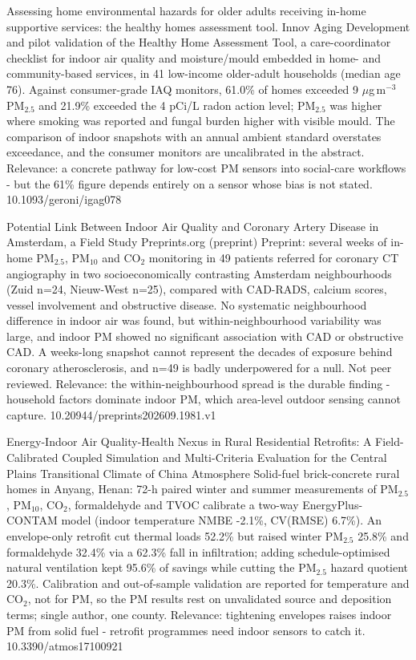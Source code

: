 \documentclass[10pt]{article}
\begin{document}
{Assessing home environmental hazards for older adults receiving in-home supportive services: the healthy homes assessment tool.}
{Innov Aging}
{Development and pilot validation of the Healthy Home Assessment Tool, a care-coordinator checklist for indoor air quality and moisture/mould embedded in home- and community-based services, in 41 low-income older-adult households (median age 76). Against consumer-grade IAQ monitors, 61.0\% of homes exceeded 9 $\mu$g\,m$^{-3}$ PM$_{2.5}$ and 21.9\% exceeded the 4 pCi/L radon action level; PM$_{2.5}$ was higher where smoking was reported and fungal burden higher with visible mould. The comparison of indoor snapshots with an annual ambient standard overstates exceedance, and the consumer monitors are uncalibrated in the abstract. Relevance: a concrete pathway for low-cost PM sensors into social-care workflows - but the 61\% figure depends entirely on a sensor whose bias is not stated.}
{10.1093/geroni/igag078}

{Potential Link Between Indoor Air Quality and Coronary Artery Disease in Amsterdam, a Field Study}
{Preprints.org (preprint)}
{Preprint: several weeks of in-home PM$_{2.5}$, PM$_{10}$ and CO$_2$ monitoring in 49 patients referred for coronary CT angiography in two socioeconomically contrasting Amsterdam neighbourhoods (Zuid n=24, Nieuw-West n=25), compared with CAD-RADS, calcium scores, vessel involvement and obstructive disease. No systematic neighbourhood difference in indoor air was found, but within-neighbourhood variability was large, and indoor PM showed no significant association with CAD or obstructive CAD. A weeks-long snapshot cannot represent the decades of exposure behind coronary atherosclerosis, and n=49 is badly underpowered for a null. Not peer reviewed. Relevance: the within-neighbourhood spread is the durable finding - household factors dominate indoor PM, which area-level outdoor sensing cannot capture.}
{10.20944/preprints202609.1981.v1}

{Energy-Indoor Air Quality-Health Nexus in Rural Residential Retrofits: A Field-Calibrated Coupled Simulation and Multi-Criteria Evaluation for the Central Plains Transitional Climate of China}
{Atmosphere}
{Solid-fuel brick-concrete rural homes in Anyang, Henan: 72-h paired winter and summer measurements of PM$_{2.5}$, PM$_{10}$, CO$_2$, formaldehyde and TVOC calibrate a two-way EnergyPlus-CONTAM model (indoor temperature NMBE -2.1\%, CV(RMSE) 6.7\%). An envelope-only retrofit cut thermal loads 52.2\% but raised winter PM$_{2.5}$ 25.8\% and formaldehyde 32.4\% via a 62.3\% fall in infiltration; adding schedule-optimised natural ventilation kept 95.6\% of savings while cutting the PM$_{2.5}$ hazard quotient 20.3\%. Calibration and out-of-sample validation are reported for temperature and CO$_2$, not for PM, so the PM results rest on unvalidated source and deposition terms; single author, one county. Relevance: tightening envelopes raises indoor PM from solid fuel - retrofit programmes need indoor sensors to catch it.}
{10.3390/atmos17100921}
\end{document}
